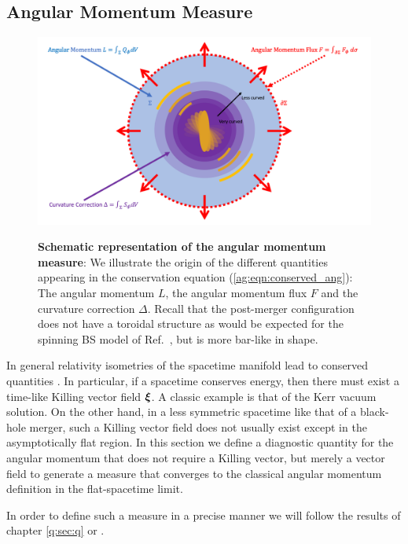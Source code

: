 \subsection{Angular Momentum Measure}\label{ag:sec:methods}

\begin{figure}[h!]
\begin{center}
    {\includegraphics[width=0.75\columnwidth]{ag_fig/FigureRobinPaper.png}}
\caption{{\bf Schematic representation of the angular momentum measure}: We illustrate the origin of the different quantities
appearing in the conservation equation
(\ref{ag:eqn:conserved_ang}): The angular momentum
    ${L}$, the {angular momentum flux} $F$ and the
    curvature correction ${\Delta}$. Recall that the post-merger
    configuration does not have a toroidal structure
    as would be expected for the spinning BS model of
    Ref.~\cite{PhysRevD.90.024068,Yoshida:1997qf}, but is more bar-like in shape.
    }
\label{ag:fig:AngMomTrick}
\end{center}
\end{figure}

\color{orchid} In general relativity isometries of the
spacetime manifold lead to conserved quantities \color{black}. In particular, if a spacetime conserves energy, then there must exist a time-like Killing vector field $\boldsymbol{\xi}$. A classic example is that of the Kerr vacuum solution. On the other hand, in a less symmetric spacetime like that of a black-hole merger, such a Killing vector field does not usually exist except in the asymptotically flat region. In this section we define a diagnostic quantity for the angular momentum that does not require a Killing vector, but merely a vector field to generate a measure that
converges to the classical angular momentum definition
in the flat-spacetime limit.

In order to define such a measure in a
precise manner we will follow the results of chapter \ref{q:sec:q} or \cite{Croft:2022gks,Clough:2021qlv}.



